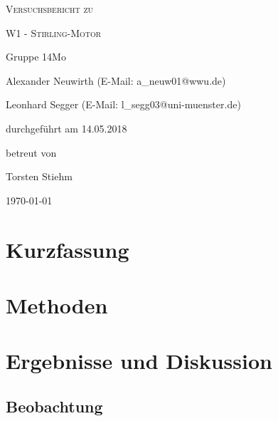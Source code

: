 \documentclass[
	a4paper,
	12pt,
	pagesize,
	ngerman
]{scrartcl}
\begin{document}
	
	\begin{titlepage}
		\centering
		{\scshape\LARGE Versuchsbericht zu \par}
		\vspace{1cm}
		{\scshape\huge W1 - Stirling-Motor \par} 
		\vspace{2.5cm}
		{\LARGE Gruppe 14Mo \par}
		\vspace{0.5cm}
		
		{\large Alexander Neuwirth (E-Mail: a\_neuw01@wwu.de) \par}
		{\large Leonhard Segger (E-Mail: l\_segg03@uni-muenster.de) \par}
		\vfill
		
		durchgeführt am 14.05.2018\par 
		betreut von\par
		{\large Torsten Stiehm} 
		
		\vfill
		
		{\large \today\par}
	\end{titlepage}
	\tableofcontents
	\newpage

	\section{Kurzfassung}
	
	\section{Methoden} \label{sec_Methoden}
	
	
	\section{Ergebnisse und Diskussion}
	

	\subsection{Beobachtung}
	
\end{document}
